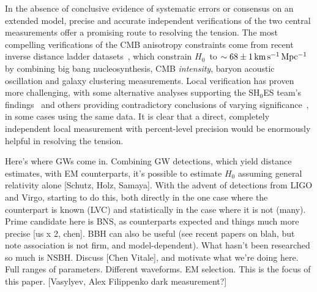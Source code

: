 \documentclass[%
 reprint,
 superscriptaddress,
 nofootinbib,
 amsmath,amssymb,
 aps,
]{revtex4-2}
\newcommand{\hubble}{\ensuremath{H_0}}
\newcommand{\kmsmpc}{\ensuremath{{\rm km\,s^{-1}\,Mpc^{-1}}}}
\begin{document}
In the absence of conclusive evidence of systematic errors or consensus on an extended model, precise and accurate independent verifications of the two central measurements offer a promising route to resolving the tension. The most compelling verifications of the CMB anisotropy constraints come from recent inverse distance ladder datasets~\cite{Addison_etal:2017,DES_H_0:2017,Philcox_etal:2020}, which constrain \hubble\ to $\sim 68 \pm 1\,\kmsmpc$ by combining big bang nucleosynthesis, CMB {\it intensity}, baryon acoustic oscillation and galaxy clustering measurements. Local verification has proven more challenging, with some alternative analyses supporting the SH$_0$ES team's findings~\cite{Yuan_etal:2019,Huang_etal:2020,H0LICOW_XIII:2020,TDCOSMO_I:2020,Pesce_etal:2020} and others providing contradictory conclusions of varying significance~\cite{Freedman_etal:2019,Freedman_etal:2020,TDCOSMO_IV:2020,Boruah_etal:2020}, in some cases using the same data. It is clear that a direct, completely independent local measurement with percent-level precision would be enormously helpful in resolving the tension.

Here's where GWs come in. Combining GW detections, which yield distance estimates, with EM counterparts, it's possible to estimate $H_0$ assuming general relativity alone [Schutz, Holz, Samaya]. With the advent of detections from LIGO and Virgo, starting to do this, both directly in the one case where the counterpart is known (LVC) and statistically in the case where it is not (many). Prime candidate here is BNS, as counterparts expected and things much more precise [us x 2, chen]. BBH can also be useful (see recent papers on blah, but note association is not firm, and model-dependent). What hasn't been researched so much is NSBH. Discuss [Chen Vitale], and motivate what we're doing here. Full ranges of parameters. Different waveforms. EM selection. This is the focus of this paper. [Vasylyev, Alex Filippenko dark measurement?]
\end{document}
